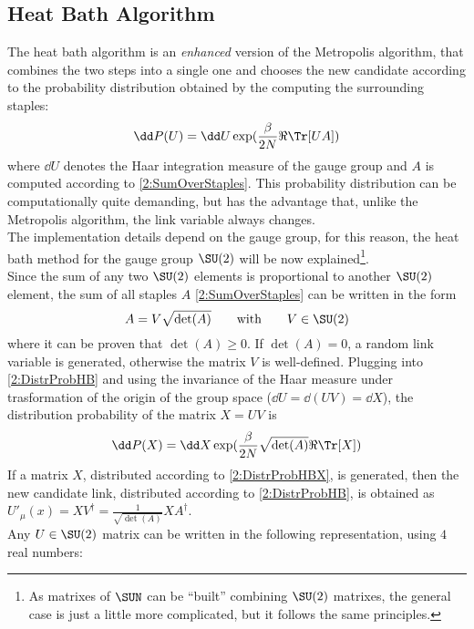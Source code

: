 \subsection{Heat Bath Algorithm}
The heat bath algorithm is an \emph{enhanced} version of the Metropolis algorithm, that combines the two steps into a single one and chooses the new candidate according to the probability distribution obtained by the computing the surrounding staples:
\begin{equation}
    \dd P(U) = \dd U \exp(\frac\beta{2N}\Re\Tr[U A]) \label{2:DistrProbHB}
\end{equation}
where $\dd U$ denotes the Haar integration measure of the gauge group and $A$ is computed according to \eqref{2:SumOverStaples}.
This probability distribution can be computationally quite demanding, but has the advantage that, unlike the Metropolis algorithm, the link variable always changes.\\
The implementation details depend on the gauge group, for this reason, the heat bath method for the gauge group $\SU(2)$ will be now explained\footnote{As matrixes of $\SUN$ can be ``built'' combining $\SU(2)$ matrixes, the general case is just a little more complicated, but it follows the same principles.}.\\
Since the sum of any two $\SU(2)$ elements is proportional to another $\SU(2)$ element, the sum of all staples $A$ \eqref{2:SumOverStaples} can be written in the form
\begin{equation}
    A = V\sqrt{\det(A)} \qquad\text{with}\qquad V\in\SU(2) \label{2:SumOverStaplesSU2}
\end{equation}
where it can be proven that $\det(A)\geq0$.
If $\det(A)=0$, a random link variable is generated, otherwise the matrix $V$ is well-defined.
Plugging into \eqref{2:DistrProbHB} and using the invariance of the Haar measure under trasformation of the origin of the group space ($\dd U = \dd (UV) = \dd X$), the distribution probability of the matrix $X=UV$ is
\begin{equation}
    \dd P(X) = \dd X \exp(\frac\beta{2N}\sqrt{\det(A)}\Re\Tr[X]) \label{2:DistrProbHBX}
\end{equation}
If a matrix $X$, distributed according to \eqref{2:DistrProbHBX}, is generated, then the new candidate link, distributed according to \eqref{2:DistrProbHB}, is obtained as $U'_\mu(x) = XV^\dagger = \frac1{\sqrt{\det(A)}}XA^\dagger$.\\
Any $U\in\SU(2)$ matrix can be written in the following representation, using $4$ real numbers:
